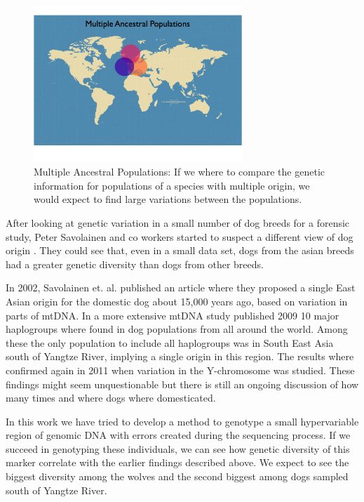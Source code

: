 \documentclass[a4paper,11pt]{kth-mag}
\begin{document}
\vspace{3 mm}


\begin{figure}[ht]
	\centering
		\includegraphics[width=0.7\textwidth]{../pictures/Multiple_ancestors_2.jpg}
	\caption{Multiple Ancestral Populations: If we where to compare the genetic information for populations of a species with multiple origin, we would expect to find large variations between the populations.}
	\label{fig:no_common_variation}
\end{figure}

\vspace{6 mm}


After looking at genetic variation in a small number of dog breeds for a forensic study, Peter Savolainen and co workers started to suspect a different view of dog origin \cite{savo97}. They could see that, even in a small data set, dogs from the asian breeds had a greater genetic diversity than dogs from other breeds.

In 2002, Savolainen et.{ }al.{ }published an article \cite{savo02} where they proposed a single East Asian origin for the domestic dog about 15,000 years ago, based on variation in parts of mtDNA. In a more extensive mtDNA study published 2009 \cite{pang09} 10 major haplogroups where found in dog populations from all around the world. Among these the only population to include all haplogroups was in South East Asia south of Yangtze River, implying a single origin in this region. The results where confirmed again in 2011 \cite{ding11} when variation in the Y-chromosome was studied.
These findings might seem unquestionable but there is still an ongoing discussion of how many times and where dogs where domesticated.
 
In this work we have tried to develop a method to genotype a small hypervariable region of genomic DNA with errors created during the sequencing process. If we succeed in genotyping these individuals, we can see how genetic diversity of this marker correlate with the earlier findings described above. We expect to see the biggest diversity among the wolves and the second biggest among dogs sampled south of Yangtze River.  
\end{document}
